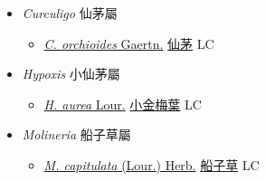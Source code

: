 
  \begin{itemize}
 \item[] \textit{Curculigo} 仙茅屬
                    
  \begin{itemize}
        \item[] \href{http://www.theplantlist.org/tpl1.1/search?q=Curculigo+orchioides}{\textit{C. orchioides} Gaertn.}   \href{\detokenize{http://taibnet.sinica.edu.tw/chi/taibnet_species_list.php?T2=仙茅&T2_new_value=true&fr=y}}{仙茅} LC
  \end{itemize}
 \item[] \textit{Hypoxis} 小仙茅屬
                    
  \begin{itemize}
        \item[] \href{http://www.theplantlist.org/tpl1.1/search?q=Hypoxis+aurea}{\textit{H. aurea} Lour.}   \href{\detokenize{http://taibnet.sinica.edu.tw/chi/taibnet_species_list.php?T2=小金梅葉&T2_new_value=true&fr=y}}{小金梅葉} LC
  \end{itemize}
 \item[] \textit{Molineria} 船子草屬
                    
  \begin{itemize}
        \item[] \href{http://www.theplantlist.org/tpl1.1/search?q=Molineria+capitulata}{\textit{M. capitulata} (Lour.) Herb.}     \href{\detokenize{http://taibnet.sinica.edu.tw/chi/taibnet_species_list.php?T2=船子草&T2_new_value=true&fr=y}}{船子草} LC
  \end{itemize}
  \end{itemize}
